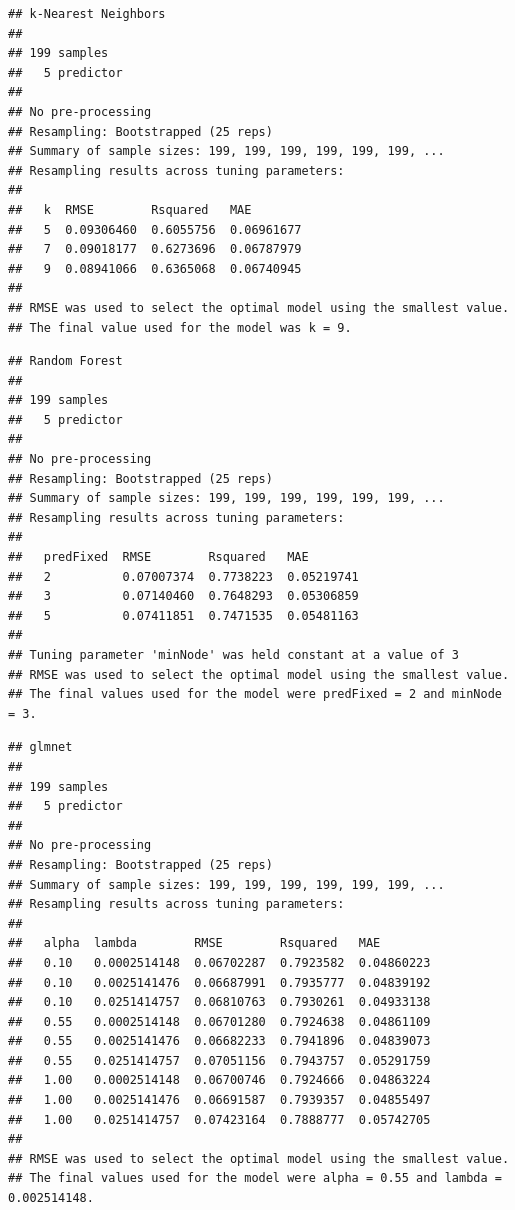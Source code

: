 \documentclass[11pt,]{article}
\newenvironment{Shaded}{\begin{snugshade}}{\end{snugshade}}
\newcommand{\NormalTok}[1]{#1}
\newcommand{\OperatorTok}[1]{\textcolor[rgb]{0.81,0.36,0.00}{\textbf{#1}}}
\begin{document}
\begin{verbatim}
## k-Nearest Neighbors 
## 
## 199 samples
##   5 predictor
## 
## No pre-processing
## Resampling: Bootstrapped (25 reps) 
## Summary of sample sizes: 199, 199, 199, 199, 199, 199, ... 
## Resampling results across tuning parameters:
## 
##   k  RMSE        Rsquared   MAE       
##   5  0.09306460  0.6055756  0.06961677
##   7  0.09018177  0.6273696  0.06787979
##   9  0.08941066  0.6365068  0.06740945
## 
## RMSE was used to select the optimal model using the smallest value.
## The final value used for the model was k = 9.
\end{verbatim}

\begin{Shaded}
\end{Shaded}

\begin{verbatim}
## Random Forest 
## 
## 199 samples
##   5 predictor
## 
## No pre-processing
## Resampling: Bootstrapped (25 reps) 
## Summary of sample sizes: 199, 199, 199, 199, 199, 199, ... 
## Resampling results across tuning parameters:
## 
##   predFixed  RMSE        Rsquared   MAE       
##   2          0.07007374  0.7738223  0.05219741
##   3          0.07140460  0.7648293  0.05306859
##   5          0.07411851  0.7471535  0.05481163
## 
## Tuning parameter 'minNode' was held constant at a value of 3
## RMSE was used to select the optimal model using the smallest value.
## The final values used for the model were predFixed = 2 and minNode = 3.
\end{verbatim}

\begin{Shaded}
\end{Shaded}

\begin{verbatim}
## glmnet 
## 
## 199 samples
##   5 predictor
## 
## No pre-processing
## Resampling: Bootstrapped (25 reps) 
## Summary of sample sizes: 199, 199, 199, 199, 199, 199, ... 
## Resampling results across tuning parameters:
## 
##   alpha  lambda        RMSE        Rsquared   MAE       
##   0.10   0.0002514148  0.06702287  0.7923582  0.04860223
##   0.10   0.0025141476  0.06687991  0.7935777  0.04839192
##   0.10   0.0251414757  0.06810763  0.7930261  0.04933138
##   0.55   0.0002514148  0.06701280  0.7924638  0.04861109
##   0.55   0.0025141476  0.06682233  0.7941896  0.04839073
##   0.55   0.0251414757  0.07051156  0.7943757  0.05291759
##   1.00   0.0002514148  0.06700746  0.7924666  0.04863224
##   1.00   0.0025141476  0.06691587  0.7939357  0.04855497
##   1.00   0.0251414757  0.07423164  0.7888777  0.05742705
## 
## RMSE was used to select the optimal model using the smallest value.
## The final values used for the model were alpha = 0.55 and lambda = 0.002514148.
\end{verbatim}
\end{document}
